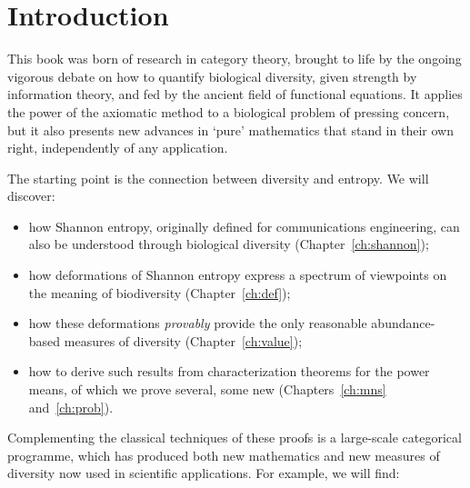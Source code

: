 \chapter*{Introduction}


This book was born of research in category theory, brought to life by the
ongoing vigorous debate on how to quantify biological diversity, given
strength by information theory, and fed by the ancient field of functional
equations.  It applies the power of the axiomatic method to a biological
problem of pressing concern, but it also presents new advances in `pure'
mathematics that stand in their own right, independently of any
application.

The starting point is the connection between diversity and entropy.  We
will discover:
% 
\begin{itemize}
\item
how Shannon entropy, originally defined for communications engineering, can
also be understood through biological diversity (Chapter~\ref{ch:shannon});

\item
how deformations of Shannon entropy express
a spectrum of viewpoints on the meaning of biodiversity
(Chapter~\ref{ch:def});

\item
how these deformations \emph{provably} provide the only reasonable
abundance-based measures of diversity (Chapter~\ref{ch:value});

\item
how to derive such results from characterization theorems for the
power means, of which we prove several, some new (Chapters~\ref{ch:mns}
and~\ref{ch:prob}). 
\end{itemize}
% 
Complementing the classical techniques of these proofs is a large-scale
categorical programme, which has produced both new mathematics and new
measures of diversity now used in scientific applications.  For example, we
will find:
% 
